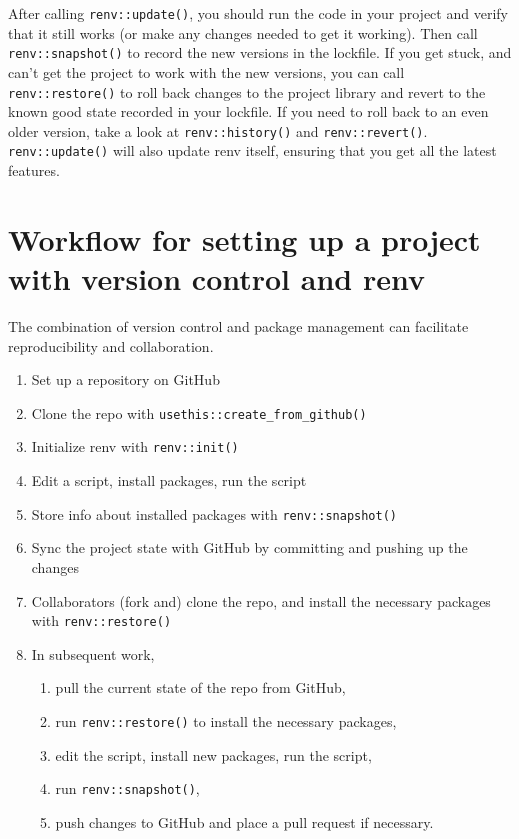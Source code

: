 \documentclass[
  letterpaper,
  DIV=11,
  numbers=noendperiod]{scrreport}
\begin{document}
After calling \texttt{renv::update()}, you should run the code in your
project and verify that it still works (or make any changes needed to
get it working). Then call \texttt{renv::snapshot()} to record the new
versions in the lockfile. If you get stuck, and can't get the project to
work with the new versions, you can call \texttt{renv::restore()} to
roll back changes to the project library and revert to the known good
state recorded in your lockfile. If you need to roll back to an even
older version, take a look at \texttt{renv::history()} and
\texttt{renv::revert()}. \texttt{renv::update()} will also update renv
itself, ensuring that you get all the latest features.

\section{Workflow for setting up a project with version control and
renv}\label{workflow-for-setting-up-a-project-with-version-control-and-renv}

The combination of version control and package management can facilitate
reproducibility and collaboration.

\begin{enumerate}
\def\labelenumi{\arabic{enumi}.}
\item
  Set up a repository on GitHub
\item
  Clone the repo with \texttt{usethis::create\_from\_github()}
\item
  Initialize renv with \texttt{renv::init()}
\item
  Edit a script, install packages, run the script
\item
  Store info about installed packages with \texttt{renv::snapshot()}
\item
  Sync the project state with GitHub by committing and pushing up the
  changes
\item
  Collaborators (fork and) clone the repo, and install the necessary
  packages with \texttt{renv::restore()}
\item
  In subsequent work,

  \begin{enumerate}
  \def\labelenumii{\alph{enumii}.}
  \item
    pull the current state of the repo from GitHub,
  \item
    run \texttt{renv::restore()} to install the necessary packages,
  \item
    edit the script, install new packages, run the script,
  \item
    run \texttt{renv::snapshot()},
  \item
    push changes to GitHub and place a pull request if necessary.
  \end{enumerate}
\end{enumerate}
\end{document}

